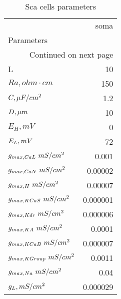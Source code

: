 \begin{longtable}{lr}
\caption{Sca cells parameters}\label{ca1_sca_cell_parameters}\\
\toprule
{} &     soma \\
Parameters      &          \\
\midrule
\endhead
\midrule
\multicolumn{2}{r}{{Continued on next page}} \\
\midrule
\endfoot

\bottomrule
\endlastfoot
L               &       10 \\
$Ra,
 ohm \cdot cm$              &      150 \\
$C, \linebreak \mu F / cm^2$              &      1.2 \\
$D,\linebreak \mu m$            &       10 \\
$E_{H}, mV$        &        0 \\
$E_L, \linebreak mV$       &      -72 \\
$g_{max, CaL    }\linebreak \  mS / cm^2$&    0.001 \\
$g_{max, CaN    }\linebreak \  mS / cm^2$&  0.00002 \\
$g_{max, H     }\linebreak \  mS / cm^2$&  0.00007 \\
$g_{max, KCaS    }\linebreak \  mS / cm^2$& 0.000001 \\
$g_{max, Kdr }\linebreak \  mS / cm^2$& 0.000006 \\
$g_{max, KA     }\linebreak \  mS / cm^2$&   0.0001 \\
$g_{max, KCaB   }\linebreak \  mS / cm^2$& 0.000007 \\
$g_{max, KGroup }\linebreak \  mS / cm^2$&   0.0011 \\
$g_{max, Na  }\linebreak \  mS / cm^2$&     0.04 \\
$g_L, \linebreak mS / cm^2$    & 0.000029 \\
\end{longtable}
